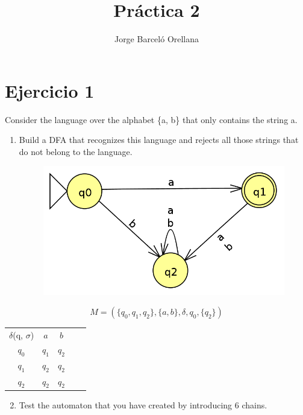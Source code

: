 \documentclass[11pt]{article}
\title{\textbf{Práctica 2}}
\author{Jorge Barceló Orellana}
\date{}
\begin{document}
\maketitle
\thispagestyle{empty}

\section*{Ejercicio 1}
Consider the language over the alphabet \{a, b\} that only contains the string a.
\begin{enumerate}
\item Build a DFA that recognizes this language and rejects all those strings that
do not belong to the language.
\begin{figure}[htp]
\centering
\includegraphics[scale=0.30]{images/automata.png}
\label{}
\end{figure}
\end{enumerate}

\begin{equation}
	M = (\{q_0, q_1, q_2\}, \{a, b\}, \delta, q_0, \{q_2\})
\end{equation}

\begin{table}[]
\centering
\begin{tabular}{c|c|ccc}
$\delta$(q, $\sigma$) & $a$    & $b$    &  &  \\ \cline{1-3}
$q_0$   & $q_1$ & $q_2$&  &  \\ \cline{1-3}
$q_1$   & $q_2$ & $q_2$ &  &  \\ \cline{1-3}
$q_2$    & $q_2$ & $q_2$ &  & 
\end{tabular}
\end{table}

\newpage

\begin{enumerate}
\setcounter{enumi}{1}
\item Test the automaton that you have created by introducing 6 chains.
\end{enumerate}
\end{document}
